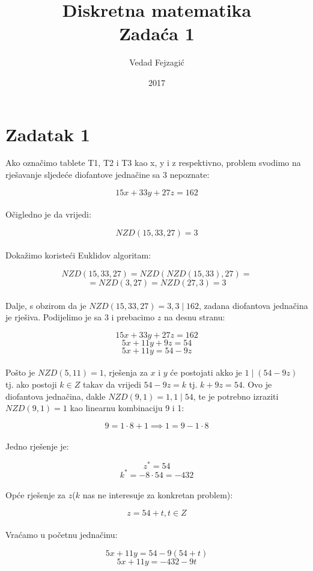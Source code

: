 \documentclass[12pt]{article}
\title{
  Diskretna matematika\\
  \large Zadaća 1 \\}
\author{Vedad Fejzagić}
\date{2017}
\begin{document}
\maketitle

\newpage

\section*{Zadatak 1\label{Z1}}

\hspace{0.65cm}Ako označimo tablete T1, T2 i T3 kao x, y i z respektivno, problem svodimo na rješavanje sljedeće diofantove jednačine sa 3 nepoznate:

$$15x + 33y + 27z = 162$$\\

Očigledno je da vrijedi:

$$NZD(15, 33, 27) = 3$$\\

Dokažimo koristeći Euklidov algoritam:

$$NZD(15, 33, 27) = NZD(NZD(15, 33), 27) =$$ 
$$= NZD(3, 27) = NZD(27, 3) = 3$$\\

Dalje, s obzirom da je $NZD(15, 33, 27) = 3, 3 \mid 162$, zadana diofantova jednačina je rješiva. Podijelimo je sa $3$ i prebacimo $z$ na desnu stranu:

$$15x + 33y + 27z = 162$$
$$5x + 11y + 9z = 54$$
$$5x + 11y = 54 - 9z$$\\

Pošto je $NZD(5, 11) = 1$, rješenja za $x$ i $y$ će postojati akko je $1 \mid (54 - 9z)$ tj. ako postoji $k\in Z$ takav da vrijedi $54 - 9z = k$ tj. $k + 9z = 54$. Ovo je diofantova jednačina, dakle $NZD(9, 1) = 1, 1 \mid 54$, te je potrebno izraziti $NZD(9, 1) = 1$ kao linearnu kombinaciju 9 i 1:

$$9 = 1 \cdot 8 + 1 \implies 1 = 9 - 1 \cdot 8$$\\

Jedno rješenje je:

$$z^{*} = 54$$
$$k^{*} = - 8 \cdot 54 = - 432$$\\

Opće rješenje za $z$($k$ nas ne interesuje za konkretan problem):

$$z = 54 + t, t\in Z$$\\

Vraćamo u početnu jednačinu:

$$5x + 11y = 54 - 9(54 + t)$$
$$5x + 11y = -432 - 9t$$\\
\end{document}
